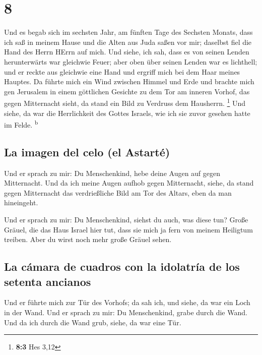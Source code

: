 \hypertarget{section-7}{%
\section{8}\label{section-7}}

 Und es begab sich im sechsten Jahr, am fünften Tage des
Sechsten Monats, dass ich saß in meinem Hause und die Alten aus Juda
saßen vor mir; daselbst fiel die Hand des Herrn HErrn auf mich.
 Und siehe, ich sah, dass es von seinen Lenden
herunterwärts war gleichwie Feuer; aber oben über seinen Lenden war es
lichthell;  und er reckte aus gleichwie eine Hand und
ergriff mich bei dem Haar meines Hauptes. Da führte mich ein Wind
zwischen Himmel und Erde und brachte mich gen Jerusalem in einem
göttlichen Gesichte zu dem Tor am inneren Vorhof, das gegen Mitternacht
sieht, da stand ein Bild zu Verdruss dem Hausherrn. \footnote{\textbf{8:3}
  Hes 3,12}  Und siehe, da war die Herrlichkeit des Gottes
Israels, wie ich sie zuvor gesehen hatte im Felde. \textsuperscript{b}

\hypertarget{la-imagen-del-celo-el-astartuxe9}{%
\subsection{La imagen del celo (el
Astarté)}\label{la-imagen-del-celo-el-astartuxe9}}

 Und er sprach zu mir: Du Menschenkind, hebe deine Augen
auf gegen Mitternacht. Und da ich meine Augen aufhob gegen Mitternacht,
siehe, da stand gegen Mitternacht das verdrießliche Bild am Tor des
Altars, eben da man hineingeht.

 Und er sprach zu mir: Du Menschenkind, siehst du auch,
was diese tun? Große Gräuel, die das Haus Israel hier tut, dass sie mich
ja fern von meinem Heiligtum treiben. Aber du wirst noch mehr große
Gräuel sehen.

\hypertarget{la-cuxe1mara-de-cuadros-con-la-idolatruxeda-de-los-setenta-ancianos}{%
\subsection{La cámara de cuadros con la idolatría de los setenta
ancianos}\label{la-cuxe1mara-de-cuadros-con-la-idolatruxeda-de-los-setenta-ancianos}}

 Und er führte mich zur Tür des Vorhofs; da sah ich, und
siehe, da war ein Loch in der Wand.  Und er sprach zu mir:
Du Menschenkind, grabe durch die Wand. Und da ich durch die Wand grub,
siehe, da war eine Tür.

